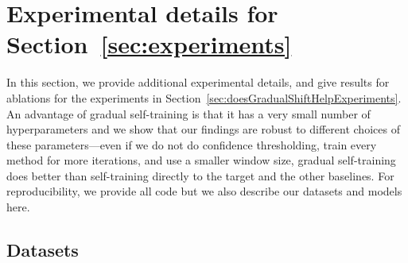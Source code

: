 \documentclass[11pt]{article}
\begin{document}
\newpage
\newpage
\section{Experimental details for Section~\ref{sec:experiments}}
\label{sec:appendix_experiments}

In this section, we provide additional experimental details, and give results for ablations for the experiments in Section~\ref{sec:doesGradualShiftHelpExperiments}.
An advantage of gradual self-training is that it has a very small number of hyperparameters and we show that our findings are robust to different choices of these parameters---even if we do not do confidence thresholding, train every method for more iterations, and use a smaller window size, gradual self-training does better than self-training directly to the target and the other baselines.
For reproducibility, we provide all code but we also describe our datasets and models here.

\subsection{Datasets}
\end{document}
